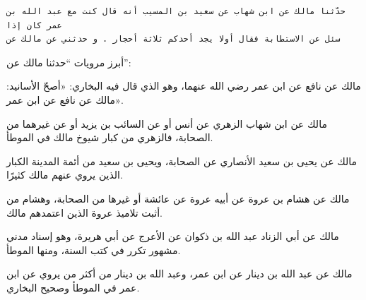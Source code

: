 \documentclass[11pt]{article}
\begin{document}
    \begin{Verbatim}[commandchars=\\\{\}]
حدّثنا مالك عن ابن شهاب عن سعيد بن المسيب أنه قال كنت مع عبد الله بن عمر كان إذا
سئل عن الاستطابة فقال أولا يجد أحدكم ثلاثة أحجار . و حدثني عن مالك عن
    \end{Verbatim}

    أبرز مرويات ``حدثنا مالك عن'':

مالك عن نافع عن ابن عمر رضي الله عنهما، وهو الذي قال فيه البخاري: «أصحّ
الأسانيد: مالك عن نافع عن ابن عمر».

مالك عن ابن شهاب الزهري عن أنس أو عن السائب بن يزيد أو عن غيرهما من
الصحابة، فالزهري من كبار شيوخ مالك في الموطأ.

مالك عن يحيى بن سعيد الأنصاري عن الصحابة، ويحيى بن سعيد من أئمة المدينة
الكبار الذين يروي عنهم مالك كثيرًا.

مالك عن هشام بن عروة عن أبيه عروة عن عائشة أو غيرها من الصحابة، وهشام من
أثبت تلاميذ عروة الذين اعتمدهم مالك.

مالك عن أبي الزناد عبد الله بن ذكوان عن الأعرج عن أبي هريرة، وهو إسناد
مدني مشهور تكرر في كتب السنة، ومنها الموطأ.

مالك عن عبد الله بن دينار عن ابن عمر، وعبد الله بن دينار من أكثر من يروي
عن ابن عمر في الموطأ وصحيح البخاري.


    
    
    
\end{document}
